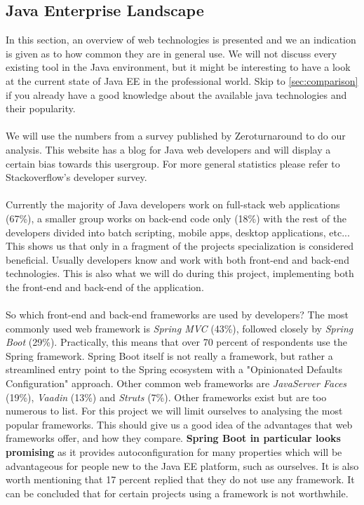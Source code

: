 \documentclass[12pt]{article}
\begin{document}
\begin{multicols}{2}
\subsection{Java Enterprise Landscape}\label{sec:javalandscape}
In this section, an overview of web technologies is presented and we an indication is given as to how common they are in general use. We will not discuss every existing tool in the Java environment, but it might be interesting to have a look at the current state of Java EE in the professional world. Skip to \ref{sec:comparison} if you already have a good knowledge about the available java technologies and their popularity.
\\\\
We will use the numbers from a survey published by Zeroturnaround to do our analysis.\cite{JavaEELandscape73:online} This website has a blog for Java web developers and will display a certain bias towards this usergroup. For more general statistics please refer to Stackoverflow's developer survey. \cite{DeveloperSurvey95:online}
\\\\
Currently the majority of Java developers work on full-stack web applications (67\%), a smaller group works on back-end code only (18\%) with the rest of the developers divided into batch scripting, mobile apps, desktop applications, etc... This shows us that only in a fragment of the projects specialization is considered beneficial. Usually developers know and work with both front-end and back-end technologies. This is also what we will do during this project, implementing both the front-end and back-end of the application.
\\\\
So which front-end and back-end frameworks are used by developers? The most commonly used web framework is \textit{Spring MVC} (43\%), followed closely by \textit{Spring Boot} (29\%). Practically, this means that over 70 percent of respondents use the Spring framework. Spring Boot itself is not really a framework, but rather a streamlined entry point to the Spring ecosystem with a "Opinionated Defaults Configuration" approach. \cite{SpringBootAdvantages67:online}\cite{SpringBootIntro23:online} Other common web frameworks are \textit{JavaServer Faces} (19\%), \textit{Vaadin} (13\%) and \textit{Struts} (7\%). Other frameworks exist but are too numerous to list. For this project we will limit ourselves to analysing the most popular frameworks. This should give us a good idea of the advantages that web frameworks offer, and how they compare. \textbf{Spring Boot in particular looks promising} as it provides autoconfiguration for many properties which will be advantageous for people new to the Java EE platform, such as ourselves. It is also worth mentioning that 17 percent replied that they do not use any framework. It can be concluded that for certain projects using a framework is not worthwhile. %

\end{multicols}
\end{document}
